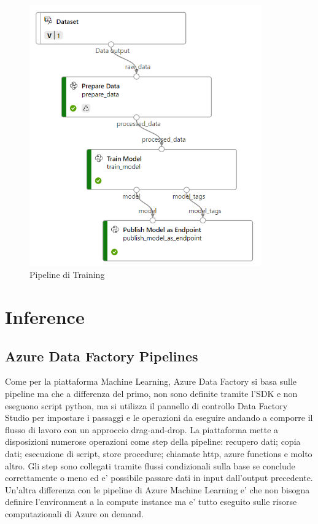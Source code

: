 \begin{figure}[t]
\centering
\includegraphics[width=10cm, scale=1]{images/pipeline}
  \caption{Pipeline di Training}
	\label{pipeline-training}

\end{figure}

\section{Inference}
\subsection{Azure Data Factory Pipelines}
Come per la piattaforma Machine Learning, Azure Data Factory si basa sulle pipeline ma che a differenza del primo, non sono definite tramite l'SDK e non eseguono script python, ma si utilizza il pannello di controllo Data Factory Studio per impostare i passaggi e le operazioni da eseguire andando a comporre il flusso di lavoro con un approccio drag-and-drop.
La piattaforma mette a disposizioni numerose operazioni come step della pipeline: recupero dati; copia dati; esecuzione di script, store procedure; chiamate http, azure functions e molto altro. 
Gli step sono collegati tramite flussi condizionali sulla base se conclude correttamente o meno ed e' possibile passare dati in input dall'output precedente.
Un'altra differenza con le pipeline di Azure Machine Learning e' che non bisogna definire l'environment a la compute instance ma e' tutto eseguito sulle risorse computazionali di Azure on demand.
